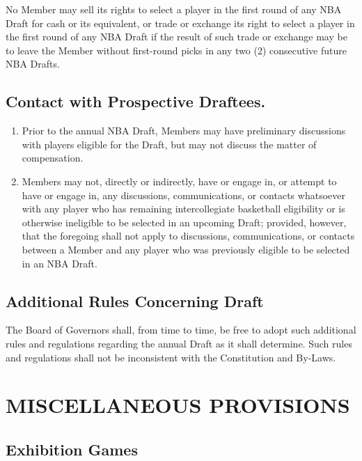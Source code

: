 \documentclass[]{book}
\providecommand{\tightlist}{%
  \setlength{\itemsep}{0pt}\setlength{\parskip}{0pt}}
\theoremstyle{definition}
\theoremstyle{definition}
\theoremstyle{definition}
\theoremstyle{remark}
\begin{document}
No Member may sell its rights to select a player in the first round of
any NBA Draft for cash or its equivalent, or trade or exchange its right
to select a player in the first round of any NBA Draft if the result of
such trade or exchange may be to leave the Member without first-round
picks in any two (2) consecutive future NBA Drafts.

\subsection{Contact with Prospective
Draftees.}\label{contact-with-prospective-draftees.}

\begin{enumerate}
\def\labelenumi{(\alph{enumi})}
\tightlist
\item
  Prior to the annual NBA Draft, Members may have preliminary
  discussions with players eligible for the Draft, but may not discuss
  the matter of compensation.
\item
  Members may not, directly or indirectly, have or engage in, or attempt
  to have or engage in, any discussions, communications, or contacts
  whatsoever with any player who has remaining intercollegiate
  basketball eligibility or is otherwise ineligible to be selected in an
  upcoming Draft; provided, however, that the foregoing shall not apply
  to discussions, communications, or contacts between a Member and any
  player who was previously eligible to be selected in an NBA Draft.
\end{enumerate}

\subsection{Additional Rules Concerning
Draft}\label{additional-rules-concerning-draft}

The Board of Governors shall, from time to time, be free to adopt such
additional rules and regulations regarding the annual Draft as it shall
determine. Such rules and regulations shall not be inconsistent with the
Constitution and By-Laws.

\section{MISCELLANEOUS PROVISIONS}\label{miscellaneous-provisions}

\subsection{Exhibition Games}\label{exhibition-games}
\end{document}
